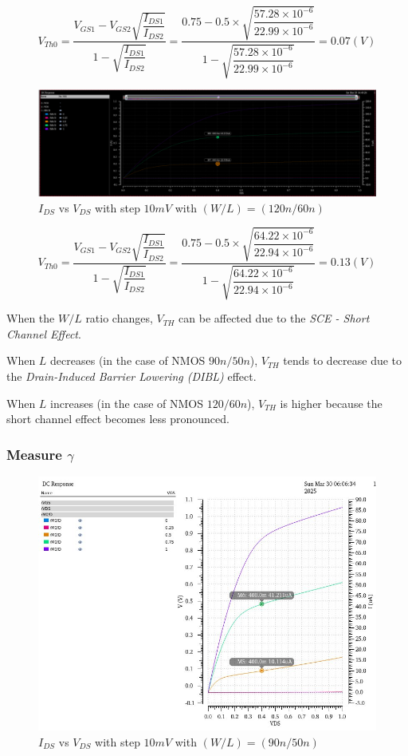 \[ V_{Th0} = \dfrac{V_{GS1} - V_{GS2}\sqrt{\dfrac{I_{DS1}}{I_{DS2}}}}{1 - \sqrt{\dfrac{I_{DS1}}{I_{DS2}}}} = \dfrac{0.75 - 0.5\times \sqrt{\dfrac{57.28\times 10^{-6}}{22.99\times 10^{-6}}}}{1 - \sqrt{\dfrac{57.28\times 10^{-6}}{22.99\times 10^{-6}}}} = 0.07(V)\]


\begin{figure}[H]
	\centering
	\includegraphics[width=.6\linewidth]{sections/pic/EX3_NMOS_vth0_(w_l)(120_60).png}
	\caption{$I_{DS}$ vs $V_{DS}$ with step $10mV$ with $(W/L) = (120n/60n)$}
	\label{f_EX3_NMOS_vth0_(w_l)(120_60)}
\end{figure}

\[ V_{Th0} = \dfrac{V_{GS1} - V_{GS2}\sqrt{\dfrac{I_{DS1}}{I_{DS2}}}}{1 - \sqrt{\dfrac{I_{DS1}}{I_{DS2}}}} = \dfrac{0.75 - 0.5\times \sqrt{\dfrac{64.22\times 10^{-6}}{22.94\times 10^{-6}}}}{1 - \sqrt{\dfrac{64.22\times 10^{-6}}{22.94\times 10^{-6}}}} = 0.13(V)\] 


When the $W/L$ ratio changes, $V_{TH}$ can be affected due to the \textit{SCE - Short Channel Effect}.

When $L$ decreases (in the case of NMOS $90n/50n$), $V_{TH}$ tends to decrease due to the \textit{Drain-Induced Barrier Lowering (DIBL)} effect.

When $L$ increases (in the case of NMOS $120/60n$), $V_{TH}$ is higher because the short channel effect becomes less pronounced.

\subsubsection{Measure $\gamma$}


\begin{figure}[H]
	\centering
	\includegraphics[width=.6\linewidth]{sections/pic/EX3_NMOS_gamma_(w_l)(90_50).png}
	\caption{$I_{DS}$ vs $V_{DS}$ with step $10mV$ with $(W/L) = (90n/50n)$}
	\label{f_EX3_NMOS_gamma_(w_l)(90_50)}
\end{figure}

